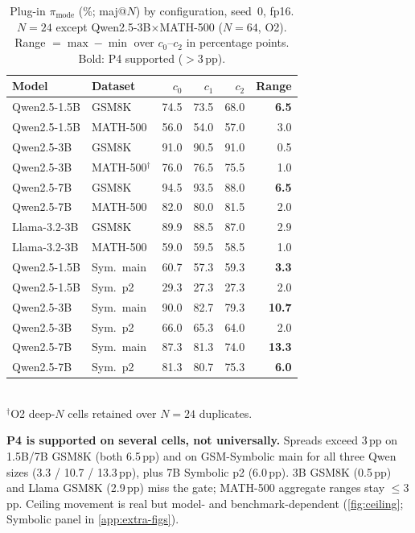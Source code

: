 \documentclass{article}
\newcommand{\pmode}{\pi_{\mathrm{mode}}}
\begin{document}
\begin{table}[t]
\centering
\caption{Plug-in $\pmode$ (\%; maj@$N$) by configuration, seed~$0$, fp16.
$N{=}24$ except Qwen2.5-3B$\times$MATH-500 ($N{=}64$, O2). Range $=\max-\min$
over $c_0$--$c_2$ in percentage points. Bold: P4 supported ($>3$\,pp).}
\label{tab:main-acc}
\small
\setlength{\tabcolsep}{3.5pt}
\begin{tabular}{llrrrr}
\toprule
Model & Dataset & $c_0$ & $c_1$ & $c_2$ & Range \\
\midrule
Qwen2.5-1.5B & GSM8K & 74.5 & 73.5 & 68.0 & \textbf{6.5} \\
Qwen2.5-1.5B & MATH-500 & 56.0 & 54.0 & 57.0 & 3.0 \\
Qwen2.5-3B & GSM8K & 91.0 & 90.5 & 91.0 & 0.5 \\
Qwen2.5-3B & MATH-500$^{\dagger}$ & 76.0 & 76.5 & 75.5 & 1.0 \\
Qwen2.5-7B & GSM8K & 94.5 & 93.5 & 88.0 & \textbf{6.5} \\
Qwen2.5-7B & MATH-500 & 82.0 & 80.0 & 81.5 & 2.0 \\
Llama-3.2-3B & GSM8K & 89.9 & 88.5 & 87.0 & 2.9 \\
Llama-3.2-3B & MATH-500 & 59.0 & 59.5 & 58.5 & 1.0 \\
\midrule
Qwen2.5-1.5B & Sym.\ main & 60.7 & 57.3 & 59.3 & \textbf{3.3} \\
Qwen2.5-1.5B & Sym.\ p2 & 29.3 & 27.3 & 27.3 & 2.0 \\
Qwen2.5-3B & Sym.\ main & 90.0 & 82.7 & 79.3 & \textbf{10.7} \\
Qwen2.5-3B & Sym.\ p2 & 66.0 & 65.3 & 64.0 & 2.0 \\
Qwen2.5-7B & Sym.\ main & 87.3 & 81.3 & 74.0 & \textbf{13.3} \\
Qwen2.5-7B & Sym.\ p2 & 81.3 & 80.7 & 75.3 & \textbf{6.0} \\
\bottomrule
\end{tabular}\\[2pt]
{\footnotesize $^{\dagger}$O2 deep-$N$ cells retained over $N{=}24$ duplicates.}
\end{table}

\textbf{P4 is supported on several cells, not universally.}
Spreads exceed 3\,pp on 1.5B/7B GSM8K (both 6.5\,pp) and on GSM-Symbolic main for
all three Qwen sizes (3.3 / 10.7 / 13.3\,pp), plus 7B Symbolic p2 (6.0\,pp).
3B GSM8K (0.5\,pp) and Llama GSM8K (2.9\,pp) miss the gate; MATH-500 aggregate
ranges stay $\le 3$\,pp. Ceiling movement is real but model- and
benchmark-dependent (\cref{fig:ceiling}; Symbolic panel in \cref{app:extra-figs}).
\end{document}
